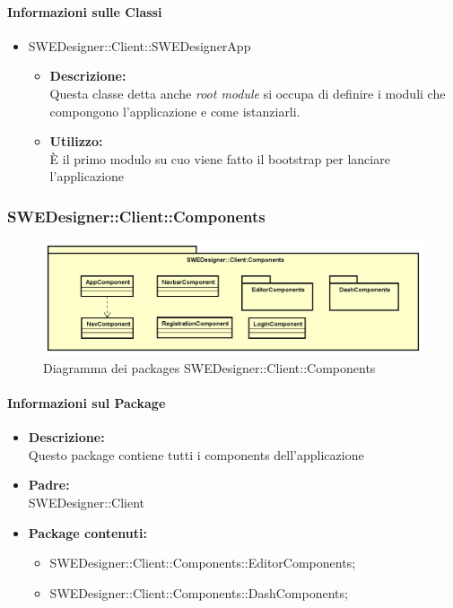 		\paragraph{Informazioni sulle Classi}
		\begin{itemize}
			\item SWEDesigner::Client::SWEDesignerApp
			\begin{itemize}
				\item \textbf{Descrizione: }\\
				Questa classe detta anche \emph{root module} si occupa di definire i
				moduli che compongono l'applicazione e come istanziarli.
				\item \textbf{Utilizzo: }\\
				È il primo modulo su cuo viene fatto il bootstrap per lanciare l'applicazione
			\end{itemize}
		\end{itemize}


		\subsubsection{SWEDesigner::Client::Components}
		 \begin{figure}[h!]
		\centering
		\includegraphics[scale=0.4]{Disegnetti/SWEDesigner__Client_Components.png}
		\caption{Diagramma dei packages SWEDesigner::Client::Components}
 		\end{figure}
		\paragraph{Informazioni sul Package}
		\begin{itemize}
			\item \textbf{Descrizione: }\\
			Questo package contiene tutti i components dell'applicazione
			\item \textbf{Padre: }\\ SWEDesigner::Client
			\item \textbf{Package contenuti: }
			\begin{itemize}
				\item SWEDesigner::Client::Components::EditorComponents;
				\item SWEDesigner::Client::Components::DashComponents;
			\end{itemize}
		\end{itemize}

